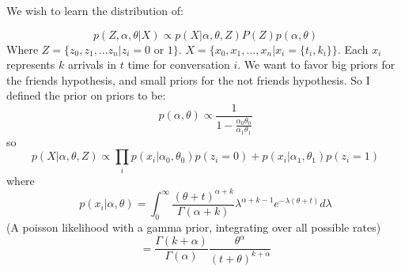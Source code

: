 \documentclass[12pt,fleqn,leqno,letterpaper]{article}
\begin{document}
We wish to learn the distribution of:

$$
p(Z, \alpha, \theta | X) \propto p(X | \alpha, \theta, Z) P(Z) p( \alpha, \theta) $$
Where $Z = \{z_0, z_1, ... z_n | z_i = 0$ or $ 1 \}$. $X = \{ x_0, x_1, ..., x_n | x_i = \{t_i, k_i\} \}$. Each $x_i$ represents $k$ arrivals in $t$ time for conversation $i$.
We want to favor big priors for the friends hypothesis, and small priors for the not friends hypothesis. So I defined the prior on priors to be:
 $$
p( \alpha, \theta) \propto \frac{1}{1 - \frac{\alpha_0 \theta_0}{\alpha_1 \theta_1}}
$$
so
$$
p(X | \alpha, \theta, Z) \propto \prod_i p(x_i | \alpha_0, \theta_0)p(z_i = 0) + p(x_i | \alpha_1, \theta_1) p(z_i = 1)
$$
where
$$
p(x_i | \alpha, \theta) = \int_0^\infty \frac{(\theta + t)^{\alpha+k}}{\Gamma({\alpha+k})} \lambda^{\alpha+k-1} e^{-\lambda(\theta+t)} d\lambda
$$(A poisson likelihood with a gamma prior, integrating over all possible rates)
$$
= \frac{\Gamma(k+\alpha)}{\Gamma(\alpha)} \frac{\theta^\alpha}{(t+\theta)^{k+\alpha}} 
$$





\end{document}
